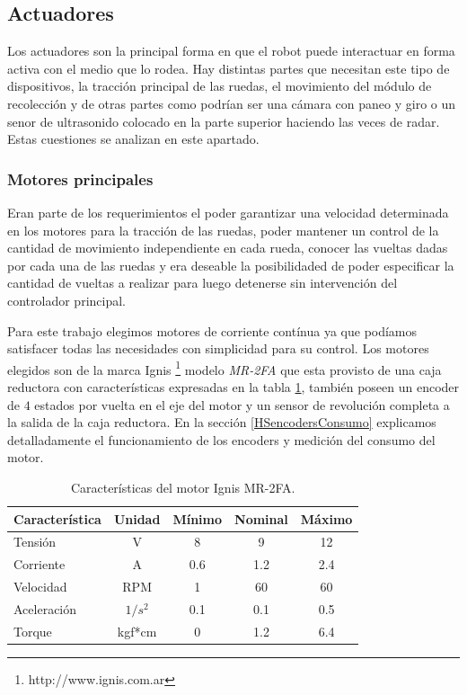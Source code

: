 \subsection{Actuadores}
\label{Hactuadores}

Los actuadores son la principal forma en que el robot puede interactuar en forma activa con el medio que lo rodea. Hay distintas partes que necesitan
este tipo de dispositivos, la tracci\'on principal de las ruedas, el movimiento del m\'odulo de recolecci\'on y de otras partes como podr\'ian ser una
c\'amara con paneo y giro o un senor de ultrasonido colocado en la parte superior haciendo las veces de radar.
Estas cuestiones se analizan en este apartado.

\subsubsection{Motores principales}
\label{HmotoresP}

Eran parte de los requerimientos el poder garantizar una velocidad determinada en los motores para la tracci\'on de las ruedas, poder mantener
un control de la cantidad de movimiento independiente en cada rueda, conocer las vueltas dadas por cada una de las ruedas y era deseable
la posibilidaded de poder especificar la cantidad de vueltas a realizar para luego detenerse sin intervenci\'on del controlador principal.

Para este trabajo elegimos motores de corriente cont\'inua ya que pod\'iamos satisfacer todas las necesidades con simplicidad para su control. Los motores
elegidos son de la marca Ignis \footnote{http://www.ignis.com.ar} modelo \emph{MR-2FA} que esta provisto de una caja reductora con caracter\'isticas
expresadas en la tabla \ref{HTmotorDC}, tambi\'en poseen un encoder de $4$ estados por vuelta en el eje del motor y un sensor de revoluci\'on completa a la salida de
la caja reductora. En la secci\'on \ref{HSencodersConsumo} explicamos detalladamente el funcionamiento de los encoders y medici\'on del consumo del motor.

\begin{table}
	\begin{center}
		\begin{tabular}{|l|c|c|c|c|}
			\hline
			Caracter\'istica & Unidad & M\'inimo & Nominal & M\'aximo \\
			\hline
			Tensi\'on & V & 8 & 9 & 12 \\
			Corriente & A & 0.6 & 1.2 & 2.4 \\
			Velocidad & RPM & 1 & 60 & 60 \\
			Aceleraci\'on & $1/s^{2}$ & 0.1 & 0.1 & 0.5 \\
			Torque & kgf*cm & 0 & 1.2 & 6.4 \\
			\hline
		\end{tabular}
	\end{center}
	\caption{Caracter\'isticas del motor Ignis MR-2FA.}
	\label{HTmotorDC}
\end{table}


